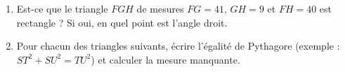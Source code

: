 
\begin{exercice}\label{exosmath-0963}

    \begin{enumerate}
        \item
            Est-ce que le triangle \( FGH\) de mesures \( FG=41\), \( GH=9\) et \( FH=40\) est rectangle ? Si oui, en quel point est l'angle droit.
        \item
            Pour chacun des triangles suivants, écrire l'égalité de Pythagore (exemple : \( ST^2+SU^2=TU^2\)) et calculer la mesure manquante.

            \begin{center}
                
   
   \hspace{2cm}
   
            \end{center}
    \end{enumerate}

\end{exercice}
